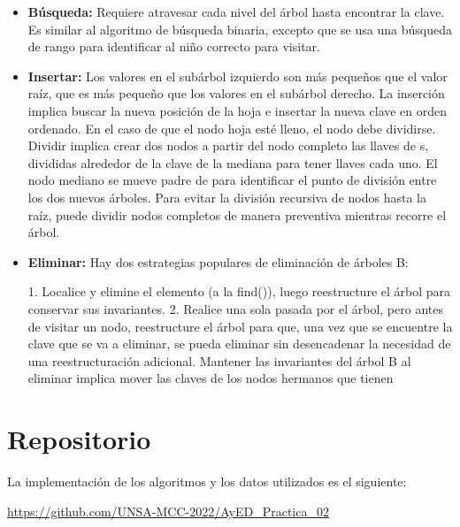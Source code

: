 \documentclass{article}
\begin{document}
\begin{enumerate}
        \vspace{5mm}
        
        \begin{itemize}
            \item \textbf{Búsqueda: } Requiere atravesar cada nivel del árbol hasta encontrar la clave. Es similar al algoritmo de búsqueda binaria, excepto que se usa una búsqueda de rango para identificar al niño correcto para visitar.
            
            \item \textbf{Insertar: } Los valores en el subárbol izquierdo son más pequeños que el valor raíz, que es más pequeño que los valores en el subárbol derecho.
            La inserción implica buscar la nueva posición de la hoja e insertar la nueva clave en orden ordenado. En el caso de que el nodo hoja esté lleno, el nodo debe dividirse.
            Dividir implica crear dos nodos a partir del nodo completo las llaves de s, divididas alrededor de la clave de la mediana para tener llaves cada uno. El nodo mediano se mueve padre de para identificar el punto de división entre los dos nuevos árboles.
            Para evitar la división recursiva de nodos hasta la raíz, puede dividir nodos completos de manera preventiva mientras recorre el árbol.
            
            \item \textbf{Eliminar: }Hay dos estrategias populares de eliminación de árboles B:
            
            1. Localice y elimine el elemento (a la find()), luego reestructure el árbol para conservar sus invariantes.
            2. Realice una sola pasada por el árbol, pero antes de visitar un nodo, reestructure el árbol para que, una vez que se encuentre la clave que se va a eliminar, se pueda eliminar sin desencadenar la necesidad de una reestructuración adicional.
            Mantener las invariantes del árbol B al eliminar implica mover las claves de los nodos hermanos que tienen
            
        \end{itemize}
        \vspace{5mm}

    \end{enumerate}
    
    \section{Repositorio}\label{sec:codigo}
        La implementación de los algoritmos y los datos utilizados es el siguiente:\par
	    \par
	    \begin{center}
	        \url{https://github.com/UNSA-MCC-2022/AyED_Practica_02}
	    \end{center}
\end{document}
